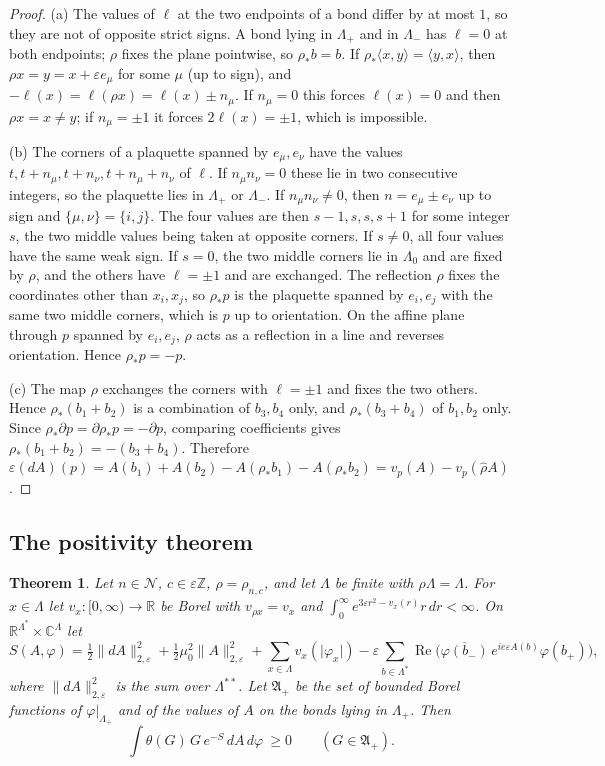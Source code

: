 \documentclass[11pt]{amsart}
\theoremstyle{plain}
\newtheorem{theorem}{Theorem}[section]
\theoremstyle{definition}
\theoremstyle{remark}
\numberwithin{equation}{section}
\newcommand{\R}{\mathbb{R}}
\newcommand{\Z}{\mathbb{Z}}
\newcommand{\C}{\mathbb{C}}
\newcommand{\eps}{\varepsilon}
\newcommand{\cN}{\mathcal{N}}
\newcommand{\fA}{\mathfrak{A}}
\newcommand{\abs}[1]{\lvert #1\rvert}
\newcommand{\norm}[1]{\lVert #1\rVert}
\newcommand{\ev}[1]{\langle #1\rangle}
\DeclareMathOperator{\re}{Re}
\begin{document}
\begin{proof}
(a) The values of $\ell$ at the two endpoints of a bond differ by at most $1$, so they are not of opposite strict signs. A bond lying in $\Lambda_+$ and in $\Lambda_-$ has $\ell=0$ at both endpoints; $\rho$ fixes the plane pointwise, so $\rho_*b=b$. If $\rho_*\ev{x,y}=\ev{y,x}$, then $\rho x=y=x+\eps e_\mu$ for some $\mu$ (up to sign), and $-\ell(x)=\ell(\rho x)=\ell(x)\pm n_\mu$. If $n_\mu=0$ this forces $\ell(x)=0$ and then $\rho x=x\ne y$; if $n_\mu=\pm1$ it forces $2\ell(x)=\pm1$, which is impossible.

(b) The corners of a plaquette spanned by $e_\mu,e_\nu$ have the values $t,t+n_\mu,t+n_\nu,t+n_\mu+n_\nu$ of $\ell$. If $n_\mu n_\nu=0$ these lie in two consecutive integers, so the plaquette lies in $\Lambda_+$ or $\Lambda_-$. If $n_\mu n_\nu\ne0$, then $n=e_\mu\pm e_\nu$ up to sign and $\{\mu,\nu\}=\{i,j\}$. The four values are then $s-1,s,s,s+1$ for some integer $s$, the two middle values being taken at opposite corners. If $s\ne0$, all four values have the same weak sign. If $s=0$, the two middle corners lie in $\Lambda_0$ and are fixed by $\rho$, and the others have $\ell=\pm1$ and are exchanged. The reflection $\rho$ fixes the coordinates other than $x_i,x_j$, so $\rho_*p$ is the plaquette spanned by $e_i,e_j$ with the same two middle corners, which is $p$ up to orientation. On the affine plane through $p$ spanned by $e_i,e_j$, $\rho$ acts as a reflection in a line and reverses orientation. Hence $\rho_*p=-p$.

(c) The map $\rho$ exchanges the corners with $\ell=\pm1$ and fixes the two others. Hence $\rho_*(b_1+b_2)$ is a combination of $b_3,b_4$ only, and $\rho_*(b_3+b_4)$ of $b_1,b_2$ only. Since $\rho_*\partial p=\partial\rho_*p=-\partial p$, comparing coefficients gives $\rho_*(b_1+b_2)=-(b_3+b_4)$. Therefore $\eps(dA)(p)=A(b_1)+A(b_2)-A(\rho_*b_1)-A(\rho_*b_2)=v_p(A)-v_p(\hat\rho A)$.
\end{proof}

\subsection{The positivity theorem}

\begin{theorem}\label{thm:RP}
Let $n\in\cN$, $c\in\eps\Z$, $\rho=\rho_{n,c}$, and let $\Lambda$ be finite with $\rho\Lambda=\Lambda$. For $x\in\Lambda$ let $v_x:[0,\infty)\to\R$ be Borel with $v_{\rho x}=v_x$ and $\int_0^\infty e^{3\eps r^2-v_x(r)}r\,dr<\infty$. On $\R^{\Lambda^*}\times\C^\Lambda$ let
\[
S(A,\varphi)=\tfrac12\norm{dA}_{2,\eps}^2+\tfrac12\mu_0^2\norm A_{2,\eps}^2+\sum_{x\in\Lambda}v_x(\abs{\varphi_x})-\eps\sum_{b\in\Lambda^*}\re\big(\overline{\varphi(b_-)}\,e^{ie\eps A(b)}\varphi(b_+)\big),
\]
where $\norm{dA}_{2,\eps}^2$ is the sum over $\Lambda^{**}$. Let $\fA_+$ be the set of bounded Borel functions of $\varphi|_{\Lambda_+}$ and of the values of $A$ on the bonds lying in $\Lambda_+$. Then
\[
\int\theta(G)\,G\,e^{-S}\,dA\,d\varphi\ \ge0\qquad(G\in\fA_+).
\]
\end{theorem}
\end{document}
